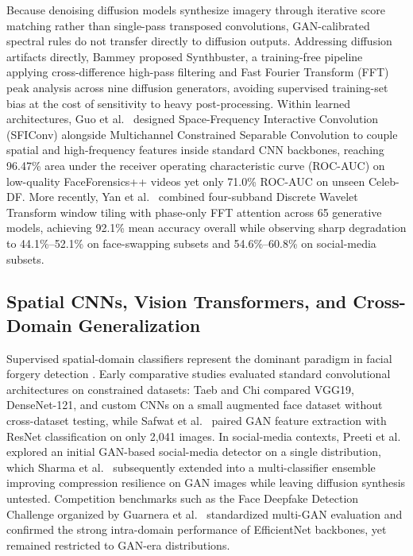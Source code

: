 \documentclass[final,5p,times,twocolumn,numafflabel]{elsarticle}
\begin{document}
Because denoising diffusion models synthesize imagery through iterative score matching rather than single-pass transposed convolutions, GAN-calibrated spectral rules do not transfer directly to diffusion outputs. Addressing diffusion artifacts directly, Bammey \cite{Bammey_2024} proposed Synthbuster, a training-free pipeline applying cross-difference high-pass filtering and Fast Fourier Transform (FFT) peak analysis across nine diffusion generators, avoiding supervised training-set bias at the cost of sensitivity to heavy post-processing. Within learned architectures, Guo et al.\ \cite{Guo_2024} designed Space-Frequency Interactive Convolution (SFIConv) alongside Multichannel Constrained Separable Convolution to couple spatial and high-frequency features inside standard CNN backbones, reaching 96.47\% area under the receiver operating characteristic curve (ROC-AUC) on low-quality FaceForensics++ videos yet only 71.0\% ROC-AUC on unseen Celeb-DF. More recently, Yan et al.\ \cite{Yan_2026} combined four-subband Discrete Wavelet Transform window tiling with phase-only FFT attention across 65 generative models, achieving 92.1\% mean accuracy overall while observing sharp degradation to 44.1\%--52.1\% on face-swapping subsets and 54.6\%--60.8\% on social-media subsets.

\subsection{Spatial CNNs, Vision Transformers, and Cross-Domain Generalization}

Supervised spatial-domain classifiers represent the dominant paradigm in facial forgery detection \cite{Heidari_2023}. Early comparative studies evaluated standard convolutional architectures on constrained datasets: Taeb and Chi \cite{Taeb_2022} compared VGG19, DenseNet-121, and custom CNNs on a small augmented face dataset without cross-dataset testing, while Safwat et al.\ \cite{Safwat_2024} paired GAN feature extraction with ResNet classification on only 2,041 images. In social-media contexts, Preeti et al.\ \cite{Preeti_2023} explored an initial GAN-based social-media detector on a single distribution, which Sharma et al.\ \cite{Sharma_2025} subsequently extended into a multi-classifier ensemble improving compression resilience on GAN images while leaving diffusion synthesis untested. Competition benchmarks such as the Face Deepfake Detection Challenge organized by Guarnera et al.\ \cite{Guarnera_2022} standardized multi-GAN evaluation and confirmed the strong intra-domain performance of EfficientNet backbones, yet remained restricted to GAN-era distributions.
\end{document}
